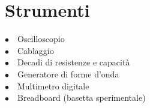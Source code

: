 \section{Strumenti}

$\bullet \quad$Oscilloscopio \\
$\bullet \quad$Cablaggio\\
$\bullet \quad$Decadi di resistenze e capacità\\
$\bullet \quad$Generatore di forme d'onda\\
$\bullet \quad$Multimetro digitale\\
$\bullet \quad$Breadboard (basetta sperimentale)\\